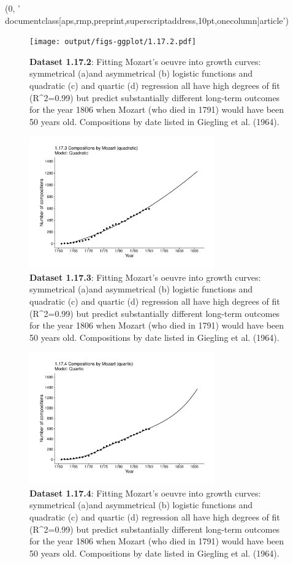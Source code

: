 (0, '\\documentclass[aps,rmp,preprint,superscriptaddress,10pt,onecolumn]{article}\n')
\begin{document}
\begin{figure}[h]
\texttt{[image: output/figs-ggplot/1.17.2.pdf]}
\caption{\textbf{Dataset 1.17.2}: Fitting Mozart's oeuvre into growth curves: symmetrical (a)and asymmetrical (b) logistic functions and quadratic (c) and quartic (d) regression all have high degrees of fit (R^2=0.99) but predict substantially different long-term outcomes for the year 1806 when Mozart (who died in 1791) would have been 50 years old. Compositions by date listed in Giegling et al. (1964).}
\end{figure}
	
\begin{figure}[h]
\includegraphics[width=8cm]{output/figs-ggplot/1.17.3.pdf}
\caption{\textbf{Dataset 1.17.3}: Fitting Mozart's oeuvre into growth curves: symmetrical (a)and asymmetrical (b) logistic functions and quadratic (c) and quartic (d) regression all have high degrees of fit (R^2=0.99) but predict substantially different long-term outcomes for the year 1806 when Mozart (who died in 1791) would have been 50 years old. Compositions by date listed in Giegling et al. (1964).}
\end{figure}
	
\begin{figure}[h]
\includegraphics[width=8cm]{output/figs-ggplot/1.17.4.pdf}
\caption{\textbf{Dataset 1.17.4}: Fitting Mozart's oeuvre into growth curves: symmetrical (a)and asymmetrical (b) logistic functions and quadratic (c) and quartic (d) regression all have high degrees of fit (R^2=0.99) but predict substantially different long-term outcomes for the year 1806 when Mozart (who died in 1791) would have been 50 years old. Compositions by date listed in Giegling et al. (1964).}
\end{figure}
	
\end{document}
